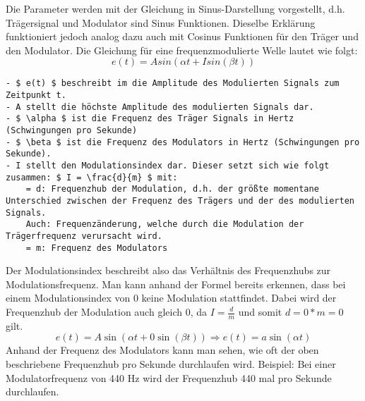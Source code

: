 Die Parameter werden mit der Gleichung in Sinus-Darstellung vorgestellt, d.h. Trägersignal und Modulator sind Sinus Funktionen. Dieselbe Erklärung funktioniert jedoch analog dazu auch mit Cosinus Funktionen für den Träger und den Modulator.
Die Gleichung für eine frequenzmodulierte Welle lautet wie folgt:
\[ e(t) = A sin(\alpha t + I sin(\beta t)) \]

\begin{lstlisting}[mathescape]
- $ e(t) $ beschreibt im die Amplitude des Modulierten Signals zum Zeitpunkt t.
- A stellt die höchste Amplitude des modulierten Signals dar. 
- $ \alpha $ ist die Frequenz des Träger Signals in Hertz (Schwingungen pro Sekunde)
- $ \beta $ ist die Frequenz des Modulators in Hertz (Schwingungen pro Sekunde). 
- I stellt den Modulationsindex dar. Dieser setzt sich wie folgt zusammen: $ I = \frac{d}{m} $ mit:
	= d: Frequenzhub der Modulation, d.h. der größte momentane Unterschied zwischen der Frequenz des Trägers und der des modulierten Signals.
	Auch: Frequenzänderung, welche durch die Modulation der Trägerfrequenz verursacht wird.
	= m: Frequenz des Modulators
\end{lstlisting}

Der Modulationsindex beschreibt also das Verhältnis des Frequenzhubs zur Modulationsfrequenz.
Man kann anhand der Formel bereits erkennen, dass bei einem Modulationsindex von 0 keine Modulation stattfindet. Dabei wird der Frequenzhub der Modulation auch gleich 0, da $ I=\frac{d}{m} $ und somit $ d = 0*m = 0 $ gilt. 
\[ e(t) = A \sin(\alpha t + 0 \sin(\beta t))  \Rightarrow  e(t) = a \sin(\alpha t) \]
Anhand der Frequenz des Modulators kann man sehen, wie oft der oben beschriebene Frequenzhub pro Sekunde durchlaufen wird. Beispiel: Bei einer Modulatorfrequenz von 440 Hz wird der Frequenzhub 440 mal pro Sekunde durchlaufen.
